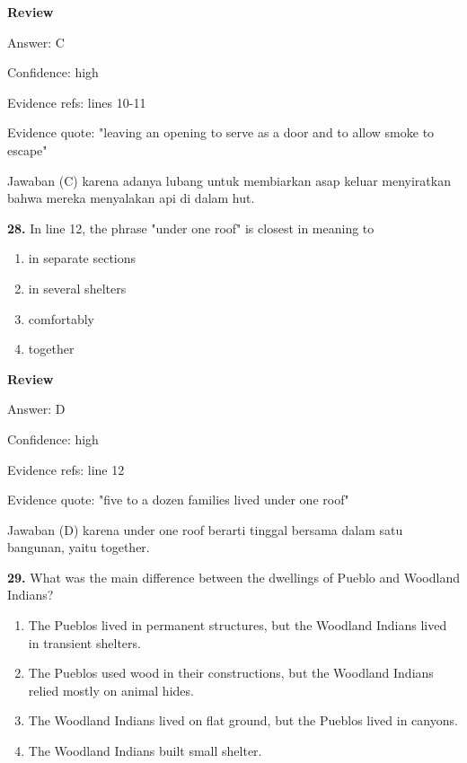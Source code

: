 \documentclass[12pt]{article}
\begin{document}
\par
\begingroup
\setlength{\parskip}{0pt}
\setlength{\parindent}{0pt}
\textbf{Review}\par
Answer: C\par
Confidence: high\par
Evidence refs: lines 10-11\par
Evidence quote: "leaving an opening to serve as a door and to allow smoke to escape"\par
Jawaban (C) karena adanya lubang untuk membiarkan asap keluar menyiratkan bahwa mereka menyalakan api di dalam hut.\par
\endgroup
\par
\vspace{0.25\baselineskip}
\noindent\textbf{28.} In line 12, the phrase "under one roof" is closest in meaning to
\begin{enumerate}[label=(\Alph*),leftmargin=*,itemsep=0.2em]
\item in separate sections
\item in several shelters
\item comfortably
\item together
\end{enumerate}
\par
\begingroup
\setlength{\parskip}{0pt}
\setlength{\parindent}{0pt}
\textbf{Review}\par
Answer: D\par
Confidence: high\par
Evidence refs: line 12\par
Evidence quote: "five to a dozen families lived under one roof"\par
Jawaban (D) karena under one roof berarti tinggal bersama dalam satu bangunan, yaitu together.\par
\endgroup
\par
\vspace{0.25\baselineskip}
\noindent\textbf{29.} What was the main difference between the dwellings of Pueblo and Woodland Indians?
\begin{enumerate}[label=(\Alph*),leftmargin=*,itemsep=0.2em]
\item The Pueblos lived in permanent structures, but the Woodland Indians lived in transient shelters.
\item The Pueblos used wood in their constructions, but the Woodland Indians relied mostly on animal hides.
\item The Woodland Indians lived on flat ground, but the Pueblos lived in canyons.
\item The Woodland Indians built small shelter.
\end{enumerate}
\end{document}
